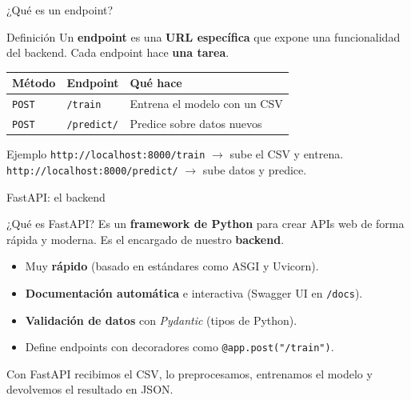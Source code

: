 \documentclass[10pt,aspectratio=169]{beamer}
\begin{document}
\begin{frame}{¿Qué es un endpoint?}
  \begin{block}{Definición}
    Un \textbf{endpoint} es una \textbf{URL específica} que expone una
    funcionalidad del backend. Cada endpoint hace \textbf{una tarea}.
  \end{block}

  \pause

  \begin{center}
    \begin{tabular}{lll}
      \toprule
      \textbf{Método} & \textbf{Endpoint} & \textbf{Qué hace} \\
      \midrule
      \texttt{POST} & \texttt{/train} & Entrena el modelo con un CSV \\
      \texttt{POST} & \texttt{/predict/} & Predice sobre datos nuevos \\
      \bottomrule
    \end{tabular}
  \end{center}

  \pause

  \begin{exampleblock}{Ejemplo}
    \texttt{http://localhost:8000/train} $\rightarrow$ sube el CSV y entrena. \\
    \texttt{http://localhost:8000/predict/} $\rightarrow$ sube datos y predice.
  \end{exampleblock}
\end{frame}

\begin{frame}{FastAPI: el backend}
  \begin{block}{¿Qué es FastAPI?}
    Es un \textbf{framework de Python} para crear APIs web de forma rápida y
    moderna. Es el encargado de nuestro \textbf{backend}.
  \end{block}

  \pause

  \begin{itemize}
    \item Muy \textbf{rápido} (basado en estándares como ASGI y Uvicorn).
    \item \textbf{Documentación automática} e interactiva (Swagger UI en \texttt{/docs}).
    \item \textbf{Validación de datos} con \textit{Pydantic} (tipos de Python).
    \item Define endpoints con decoradores como \texttt{@app.post("/train")}.
  \end{itemize}

  \pause
  \begin{center}
    \small Con FastAPI recibimos el CSV, lo preprocesamos, entrenamos el modelo
    y devolvemos el resultado en JSON.
  \end{center}
\end{frame}
\end{document}
